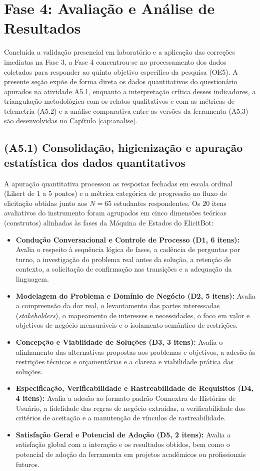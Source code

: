\section{Fase 4: Avaliação e Análise de Resultados}
\label{sec:execucao_fase4}

Concluída a validação presencial em laboratório e a aplicação das correções imediatas na Fase 3, a Fase 4 concentrou-se no processamento dos dados coletados para responder ao quinto objetivo específico da pesquisa (OE5). A presente seção expõe de forma direta os dados quantitativos do questionário apurados na atividade A5.1, enquanto a interpretação crítica desses indicadores, a triangulação metodológica com os relatos qualitativos e com as métricas de telemetria (A5.2) e a análise comparativa entre as versões da ferramenta (A5.3) são desenvolvidas no Capítulo \ref{cap:analise}.

\subsection{(A5.1) Consolidação, higienização e apuração estatística dos dados quantitativos}
\label{subsec:exec_a51}

A apuração quantitativa processou as respostas fechadas em escala ordinal (Likert de 1 a 5 pontos) e a métrica categórica de progressão no fluxo de elicitação obtidas junto aos $N = 65$ estudantes respondentes. Os 20 itens avaliativos do instrumento foram agrupados em cinco dimensões teóricas (construtos) alinhadas às fases da Máquina de Estados do ElicitBot:

\begin{itemize}
    \item \textbf{Condução Conversacional e Controle de Processo (D1, 6 itens):} Avalia o respeito à sequência lógica de fases, a cadência de perguntas por turno, a investigação do problema real antes da solução, a retenção de contexto, a solicitação de confirmação nas transições e a adequação da linguagem.
    \item \textbf{Modelagem do Problema e Domínio de Negócio (D2, 5 itens):} Avalia a compreensão da dor real, o levantamento das partes interessadas (\textit{stakeholders}), o mapeamento de interesses e necessidades, o foco em valor e objetivos de negócio mensuráveis e o isolamento semântico de restrições.
    \item \textbf{Concepção e Viabilidade de Soluções (D3, 3 itens):} Avalia o alinhamento das alternativas propostas aos problemas e objetivos, a adesão às restrições técnicas e orçamentárias e a clareza e viabilidade prática das soluções.
    \item \textbf{Especificação, Verificabilidade e Rastreabilidade de Requisitos (D4, 4 itens):} Avalia a adesão ao formato padrão Connextra de Histórias de Usuário, a fidelidade das regras de negócio extraídas, a verificabilidade dos critérios de aceitação e a manutenção de vínculos de rastreabilidade.
    \item \textbf{Satisfação Geral e Potencial de Adoção (D5, 2 itens):} Avalia a satisfação global com a interação e os resultados obtidos, bem como o potencial de adoção da ferramenta em projetos acadêmicos ou profissionais futuros.
\end{itemize}

